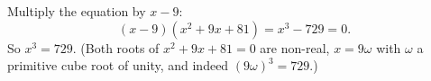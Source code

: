 Multiply the equation by $x-9$:
\[
(x-9)(x^2+9x+81)=x^3-729=0 .
\]
So $x^3=\boxed{729}$. (Both roots of $x^2+9x+81=0$ are non-real, $x=9\omega$ with $\omega$ a primitive cube root of unity, and indeed $(9\omega)^3=729$.)
